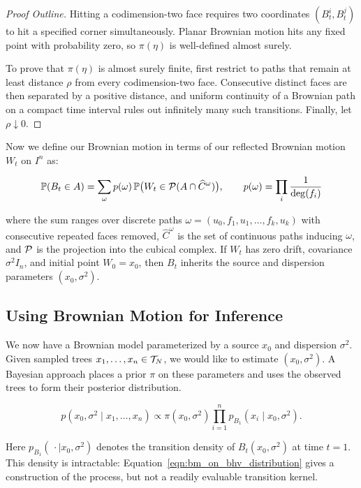  \begin{proof}[Proof Outline]
     Hitting a codimension-two face requires two coordinates
     $(B^i_t,B^j_t)$ to hit a specified corner simultaneously. Planar Brownian
     motion hits any fixed point with probability zero, so $\pi(\eta)$ is
     well-defined almost surely.

     To prove that $\pi(\eta)$ is almost surely finite, first restrict to paths
     that remain at least distance $\rho$ from every codimension-two face.
     Consecutive distinct faces are then separated by a positive distance, and
     uniform continuity of a Brownian path on a compact time interval rules out
     infinitely many such transitions. Finally, let $\rho\downarrow0$.
 \end{proof}

 \noindent Now we define our Brownian motion in terms of our reflected Brownian motion $W_t$ on $I^n$ as:

 \begin{equation}
      \mathbb{P}(B_t \in A) = \sum_\omega p(\omega)\,
      \mathbb{P}\bigl(W_t \in {\mathcal P}(A \cap \widehat{C}^{\omega})\bigr),
      \qquad p(\omega) = \prod_i \frac{1}{\deg(f_i)}
      \label{eqn:bm_on_bhv_distribution}
 \end{equation}

\noindent where the sum ranges over discrete paths
$\omega=(u_0,f_1,u_1,\ldots,f_k,u_k)$ with consecutive repeated faces removed,
$\widehat{C}^{\omega}$ is the set of continuous paths inducing $\omega$, and
${\mathcal P}$ is the projection into the cubical complex. If $W_t$ has zero drift,
covariance $\sigma^2I_n$, and initial point $W_0=x_0$, then $B_t$ inherits the
source and dispersion parameters $(x_0,\sigma^2)$.

\subsection{Using Brownian Motion for Inference}

We now have a Brownian model parameterized by a source $x_0$ and dispersion
$\sigma^2$. Given sampled trees $x_1,\ldots,x_n\in{\mathcal T}_N$, we would like to
estimate $(x_0,\sigma^2)$. A Bayesian approach places a prior $\pi$ on these
parameters and uses the observed trees to form their posterior distribution.

\[p(x_0,\sigma^2\mid x_1,\ldots,x_n)
  \propto \pi(x_0,\sigma^2)
  \prod_{i=1}^n p_{B_1}(x_i\mid x_0,\sigma^2).\]

\noindent Here $p_{B_1}(\,\cdot\mid x_0,\sigma^2)$ denotes the transition
density of $B_t(x_0,\sigma^2)$ at time $t=1$. This density is intractable:
Equation~\eqref{eqn:bm_on_bhv_distribution} gives a construction of the
process, but not a readily evaluable transition kernel.

